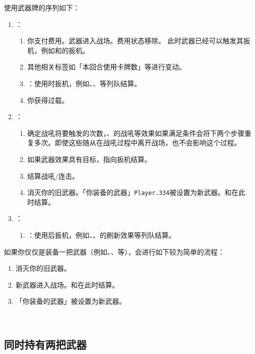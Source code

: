 使用武器牌的序列如下：
\begin{enumerate}
    \item {}：
    \begin{enumerate}
        \item 你支付费用。武器进入战场。费用状态移除。
            \notice 此时武器已经可以触发其扳机，例如和的扳机。
        \item 其他相关标签如「本回合使用卡牌数」等进行变动。
        \item {}：使用时扳机，例如、、等列队结算。
        \item 你获得过载。
    \end{enumerate}

    \item {}：
    \begin{enumerate}
        \item 确定战吼将要触发的次数，、的战吼等效果如果满足条件会将下两个步骤重复多次。即使这些随从在战吼过程中离开战场，也不会影响这个过程。
        \item 如果武器效果具有目标，指向扳机结算。
        \item 结算战吼/连击。
        \item 消灭你的旧武器。「你装备的武器」\texttt{Player.334}被设置为新武器。和在此时结算。
    \end{enumerate}

    \item {}：
    \begin{enumerate}
        \item {}：使用后扳机，例如、、的刷新效果等列队结算。
    \end{enumerate}
\end{enumerate}
​
如果你仅仅是装备一把武器（例如、、等），会进行如下较为简单的流程：
\begin{enumerate}
    \item 消灭你的旧武器。
    \item 新武器进入战场。和在此时结算。
    \item 「你装备的武器」被设置为新武器。
\end{enumerate}
​
\subsection{同时持有两把武器}

